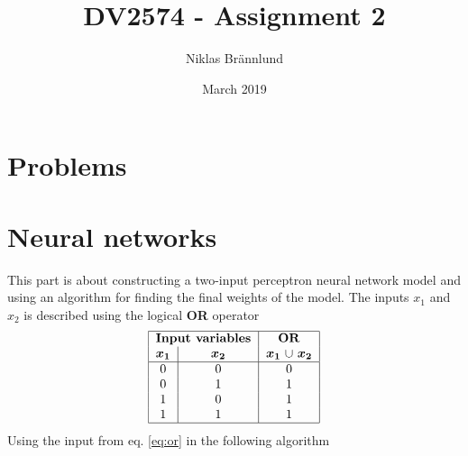 \documentclass{article}
\title{DV2574 - Assignment 2}
\author{Niklas Brännlund}
\date{March 2019}
\begin{document}
\maketitle

\section*{Problems}
    \section{Neural networks}
    This part is about constructing a two-input perceptron neural network model and using an algorithm for finding the final weights of the model. The inputs  $x_1$ and $x_2$ is described using the logical \textbf{OR} operator
    \begin{equation}
        \begin{tabular}{ | c | c | c | }
            \hline
            \multicolumn{2}{ |c| }{\textbf{Input variables}} & \textbf{OR} \\ 
            $\boldsymbol{x_1}$ & $\boldsymbol{x_2}$ & $\boldsymbol{x_1}$ $\cup$ $\boldsymbol{x_2}$ \\ \hline
            0 & 0 & 0\\
            0 & 1 & 1\\
            1 & 0 & 1\\
            1 & 1 & 1\\ \hline
        \end{tabular}
        \label{eq:or}
    \end{equation}
    Using the input from eq. \eqref{eq:or} in the following algorithm \\
\end{document}
